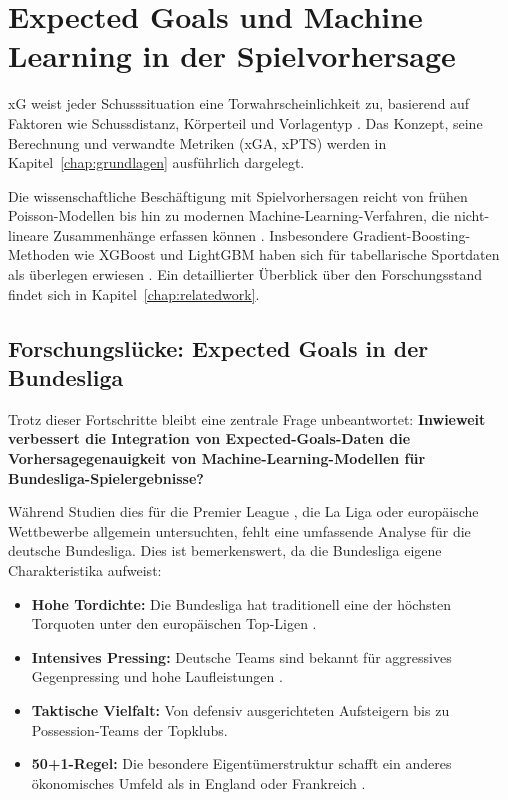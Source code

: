 \section{Expected Goals und Machine Learning in der Spielvorhersage}

xG weist jeder Schusssituation eine Torwahrscheinlichkeit zu, basierend
auf Faktoren wie Schussdistanz, Körperteil und Vorlagentyp
\cite{Spearman2018,AnzerBauer2021}. Das Konzept, seine Berechnung und
verwandte Metriken (xGA, xPTS) werden in
Kapitel~\ref{chap:grundlagen} ausführlich dargelegt.

Die wissenschaftliche Beschäftigung mit Spielvorhersagen reicht von frühen
Poisson-Modellen \cite{Maher1982,DixonColes1997} bis hin zu modernen
Machine-Learning-Verfahren, die nicht-lineare Zusammenhänge erfassen
können \cite{BunkerThabtah2019}. Insbesondere Gradient-Boosting-Methoden
wie XGBoost und LightGBM haben sich für tabellarische Sportdaten als
überlegen erwiesen \cite{GrollLeyEffenberger2019,HubacekSourekZelezny2019}.
Ein detaillierter Überblick über den Forschungsstand findet sich in
Kapitel~\ref{chap:relatedwork}.

\subsection{Forschungslücke: Expected Goals in der Bundesliga}

Trotz dieser Fortschritte bleibt eine zentrale Frage unbeantwortet:
\textbf{Inwieweit verbessert die Integration von Expected-Goals-Daten die
Vorhersagegenauigkeit von Machine-Learning-Modellen für
Bundesliga-Spielergebnisse?}

Während Studien dies für die Premier League \cite{HubacekSourekZelezny2019},
die La Liga \cite{PappalardoEtAl2019} oder europäische Wettbewerbe allgemein
\cite{VanEetveldeEtAl2024} untersuchten, fehlt eine umfassende Analyse für
die deutsche Bundesliga. Dies ist bemerkenswert, da die Bundesliga eigene
Charakteristika aufweist:

\begin{itemize}
    \item \textbf{Hohe Tordichte:} Die Bundesliga hat traditionell eine
          der höchsten Torquoten unter den europäischen Top-Ligen
          \cite{Transfermarkt2024}.
    \item \textbf{Intensives Pressing:} Deutsche Teams sind bekannt für
          aggressives Gegenpressing und hohe Laufleistungen
          \cite{ReinMemmert2016}.
    \item \textbf{Taktische Vielfalt:} Von defensiv ausgerichteten
          Aufsteigern bis zu Possession-Teams der Topklubs.
    \item \textbf{50+1-Regel:} Die besondere Eigentümerstruktur schafft
          ein anderes ökonomisches Umfeld als in England oder Frankreich
          \cite{Mueller2019}.
\end{itemize}

